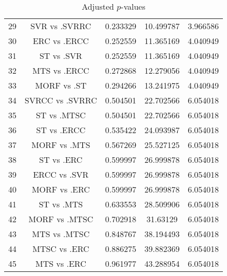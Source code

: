 \documentclass[a4paper,10pt]{article}
\begin{document}
\begin{landscape}
\begin{table}[!htp]
\begin{tabular}{ccccc}
29&SVR vs .SVRRC&0.233329&10.499787&3.966586\\
30&ERC vs .ERCC&0.252559&11.365169&4.040949\\
31&ST vs .SVR&0.252559&11.365169&4.040949\\
32&MTS vs .ERCC&0.272868&12.279056&4.040949\\
33&MORF vs .ST&0.294266&13.241975&4.040949\\
34&SVRCC vs .SVRRC&0.504501&22.702566&6.054018\\
35&ST vs .MTSC&0.504501&22.702566&6.054018\\
36&ST vs .ERCC&0.535422&24.093987&6.054018\\
37&MORF vs .MTS&0.567269&25.527125&6.054018\\
38&ST vs .ERC&0.599997&26.999878&6.054018\\
39&ERCC vs .SVR&0.599997&26.999878&6.054018\\
40&MORF vs .ERC&0.599997&26.999878&6.054018\\
41&ST vs .MTS&0.633553&28.509906&6.054018\\
42&MORF vs .MTSC&0.702918&31.63129&6.054018\\
43&MTS vs .MTSC&0.848767&38.194493&6.054018\\
44&MTSC vs .ERC&0.886275&39.882369&6.054018\\
45&MTS vs .ERC&0.961977&43.288954&6.054018\\
\hline
\end{tabular}
\caption{Adjusted $p$-values}
\end{table}

\end{landscape}
\end{document}
